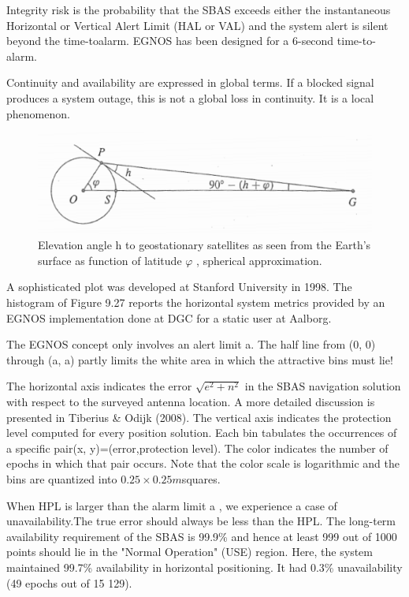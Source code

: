		Integrity risk is the probability that the SBAS exceeds either the instantaneous Horizontal or Vertical Alert Limit (HAL or VAL) and the system alert is silent beyond the time-toalarm. EGNOS has been designed for a 6-second time-to-alarm.
		
		Continuity and availability are expressed in global terms. If a blocked signal produces a system outage, this is not a global loss in continuity. It is a local phenomenon.
		
		\begin{figure}[h]
			\centering
			\includegraphics[width=0.7\linewidth]{TeX_files/Part03/chapter09/image/9-29}
			\caption{Elevation angle h to geostationary satellites as seen from the Earth’s surface as function of latitude $\varphi$ , spherical approximation.}
			\label{fig:9-29}
		\end{figure}
		
		A sophisticated plot was developed at Stanford University in 1998. The histogram of Figure 9.27 reports the horizontal system metrics provided by an EGNOS implementation done at DGC for a static user at Aalborg.
		
		The EGNOS concept only involves an alert limit a. The half line from (0, 0) through (a, a) partly limits the white area in which the attractive bins must lie!
		
		The horizontal axis indicates the error $\sqrt{e^2+n^2}$ in the SBAS navigation solution with respect to the surveyed antenna location. A more detailed discussion is presented in Tiberius \& Odijk (2008). The vertical axis indicates the protection level computed for every position solution. Each bin tabulates the occurrences of a specific pair(x, y)=(error,protection level). The color indicates the number of epochs in which that pair occurs. Note that the color scale is logarithmic and the bins are quantized into $0.25 \times 0.25m$squares.
		
		When HPL is larger than the alarm limit a , we experience a case of unavailability.The true error should always be less than the HPL. The long-term availability requirement of the SBAS is 99.9\% and hence at least 999 out of 1000 points should lie in the "Normal Operation" (USE) region. Here, the system maintained 99.7\% availability in horizontal positioning. It had 0.3\% unavailability (49 epochs out of 15 129).
		
